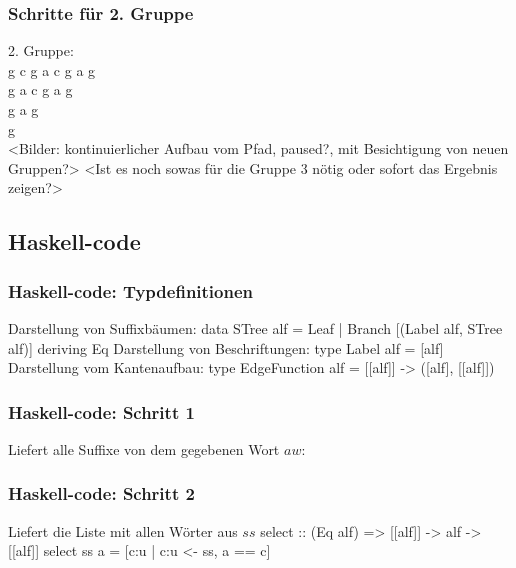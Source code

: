 \documentclass{beamer}
\begin{document}

\begin{frame}[t]
\frametitle{Schritte für 2. Gruppe}
    2. Gruppe:          \\
    g c g a c g a g     \\
    g a c g a g         \\
    g a g               \\
    g                   \\
\bigskip
<Bilder: kontinuierlicher Aufbau vom Pfad, paused?, mit Besichtigung von neuen Gruppen?>
\bigskip
<Ist es noch sowas für die Gruppe 3 nötig oder sofort das Ergebnis zeigen?>
\end{frame}


\subsection{Haskell-code}


\begin{frame}[t]
\frametitle{Haskell-code: Typdefinitionen}
    Darstellung von Suffixbäumen:
    \medskip
    data STree alf = Leaf | Branch [(Label alf, STree alf)] deriving Eq
    \bigskip
    Darstellung von Beschriftungen:
    \medskip
    type Label alf = [alf]
    \bigskip
    Darstellung vom Kantenaufbau:
    \medskip
    type EdgeFunction alf = [[alf]] -> ([alf], [[alf]])
\end{frame}


\begin{frame}[t]
\frametitle{Haskell-code: Schritt 1}
    Liefert alle Suffixe von dem gegebenen Wort $aw$:


\end{frame}


\begin{frame}[t]
\frametitle{Haskell-code: Schritt 2}
    Liefert die Liste mit allen Wörter aus $ss$
    \bigskip
    select :: (Eq alf) => [[alf]] -> alf -> [[alf]]
    \bigskip
    select ss a = [c:u | c:u <- ss, a == c]
\end{frame}
\end{document}
